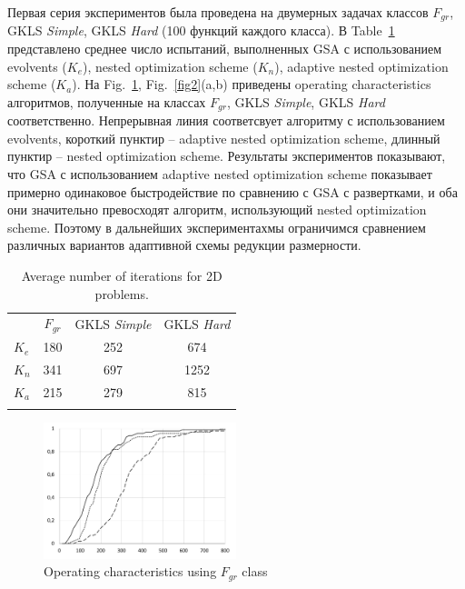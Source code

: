 \documentclass[runningheads]{llncs}
\begin{document}
Первая серия экспериментов была проведена на двумерных задачах классов $F_{gr}$, GKLS \textit{Simple}, GKLS \textit{Hard} (100 функций каждого класса). В Table~\ref{tab1}  представлено среднее число испытаний, выполненных GSA с использованием evolvents ($K_e$), nested optimization scheme ($K_n$), adaptive nested optimization scheme ($K_a$). На Fig.~\ref{fig1}, Fig.~\ref{fig2}(a,b) приведены operating characteristics алгоритмов, полученные на классах $F_{gr}$, GKLS \textit{Simple}, GKLS \textit{Hard} соответственно. Непрерывная линия соответсвует алгоритму с использованием evolvents, короткий пунктир -- adaptive nested optimization scheme, длинный пунктир -- nested optimization scheme. Результаты экспериментов показывают, что GSA с использованием adaptive nested optimization scheme показывает примерно одинаковое быстродействие  по сравнению с GSA с развертками, и оба они значительно превосходят алгоритм, использующий nested optimization scheme. Поэтому в дальнейших экспериментахмы ограничимся сравнением различных вариантов адаптивной схемы редукции размерности.

\begin{table}
\centering
\caption{Average number of iterations for 2D problems.}\label{tab1}
\begin{tabular}{lccc}
\hline\noalign{\smallskip}
 &  $F_{gr}$  &  GKLS \textit{Simple} &  GKLS \textit{Hard} \\
\noalign{\smallskip}\hline\noalign{\smallskip}
 $K_e$ & 180  & 252 & 674 \\
 $K_n$ & 341  & 697 & 1252 \\
 $K_a$ & 215  & 279 & 815 \\
\noalign{\smallskip}\hline
\end{tabular}
\end{table}

\begin{figure}
\centering
\includegraphics[width=0.50\textwidth]{2D.pdf}
\caption{Operating characteristics using $F_{gr}$ class} 
\label{fig1}
\end{figure}
\end{document}
